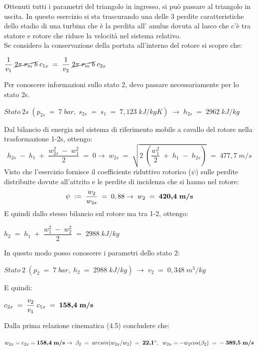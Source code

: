 \documentclass[a4paper, twoside, 12pt]{report}
\begin{document}
Ottenuti tutti i parametri del triangolo in ingresso, si può passare al triangolo in uscita. 
In questo esercizio si sta trascurando una delle 3 perdite caratteristiche dello stadio di una turbina che è la perdita all' anulus dovuta al lasco che c'è tra statore e rotore che riduce la velocità nel sistema relativo.\\
Se considero la conservazione della portata all'interno del rotore si scopre che:
\begin{center}
	$\dfrac{1}{v_{1}}\;\cancel{2\pi\;r_{m}\;b}\;c_{1x}\;=\;\dfrac{1}{v_{2}}\;\cancel{2\pi\;r_{m}\;b}\;c_{2x}$
\end{center}
Per conoscere informazioni sullo stato 2, devo passare necessariamente per lo stato 2s.
\begin{center}
	$Stato\:2s\;(p_{2s}\;=\;7\;bar,\;s_{2s}\;=\;s_{1}\;=\;7,123\;kJ/kgK)\;\to\;h_{2s}\;=\;2962\;kJ/kg$
\end{center}
Dal bilancio di energia nel sistema di riferimento mobile a cavallo del rotore nella trasformazione 1-2s, ottengo:
\begin{equation}
	h_{2s}\;-\;h_{1}\;+\;\dfrac{w_{2s}^{2}\;-\;w_{1}^{2}}{2}\;=\;0\to\;w_{2s}\;=\;\sqrt{2\;(\frac{w_{1}^2}{2}\;+\;h_{1}\;-\;h_{2s})}\;=\;477,7\;m/s
\end{equation}
Visto che l'esercizio fornisce il coefficiente riduttivo rotorico ($\psi$) sulle perdite distribuite dovute all'attrito e le perdite di incidenza che si hanno nel rotore:
\begin{equation}
	\psi\;:=\;\dfrac{w_{2}}{w_{2s}}\;=\;0,88\to\;w_{2}\;=\;\textbf{420,4\;m/s}
\end{equation}
E quindi dallo stesso bilancio sul rotore ma tra 1-2, ottengo:
\begin{center}
	$h_{2}\;=\;h_{1}\;+\;\dfrac{w_{1}^{2}\;-\;w_{2}^{2}}{2}\;=\;2988\;kJ/kg$
\end{center}
In questo modo posso conoscere i parametri dello stato 2:
\begin{center}
	$Stato\:2\;(p_{2}\;=\;7\;bar,\;h_{2}\;=\;2988\;kJ/kg)\;\to\;v_{2}\;=\;0,348\;m^{3}/kg$
\end{center}
E quindi:
\begin{center}
	$c_{2x}\;=\;\dfrac{v_{2}}{v_{1}}\;c_{1x}\;=\;\textbf{158,4\;m/s}$
\end{center}
Dalla prima relazione cinematica (4.5) concludere che:
\begin{center}
	$w_{2x}=c_{2x}=\textbf{158,4\;m/s}\to\;\beta_{2}\;=\;arcsin(w_{2x}/w_{2})\;=\;\textbf{22,1$^{\circ}$},\;\;w_{2u}=-w_{2}cos(\beta_{2})\;=\;-\;\textbf{389,5\;m/s}$
\end{center}
\end{document}
